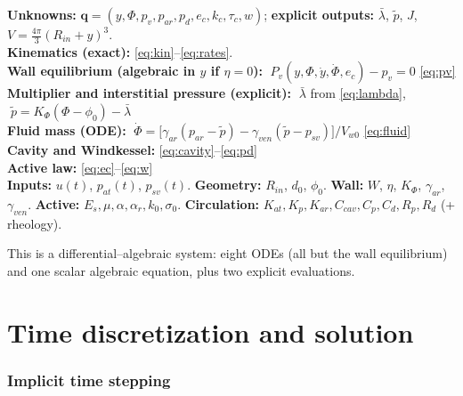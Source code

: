 \documentclass[11pt,a4paper]{article}
\newcommand{\Rin}{R_{in}}
\newcommand{\lb}{\bar\lambda}
\newcommand{\pf}{\tilde p}
\newcommand{\Vw}{V_{w0}}
\begin{document}
\begin{tcolorbox}[breakable,title=State and equations]
\textbf{Unknowns:} $\mathbf q=(y,\Phi,p_v,p_{ar},p_d,e_c,k_c,\tau_c,w)$; \textbf{explicit outputs:} $\lb$, $\pf$, $J$, $V=\tfrac{4\pi}{3}(\Rin+y)^3$.\\[2pt]
\textbf{Kinematics (exact):} \eqref{eq:kin}--\eqref{eq:rates}.\\
\textbf{Wall equilibrium (algebraic in $y$ if $\eta=0$):} $\;P_v(y,\Phi,\dot y,\dot\Phi,e_c)-p_v=0$ \hfill \eqref{eq:pv}\\
\textbf{Multiplier and interstitial pressure (explicit):} $\;\lb$ from \eqref{eq:lambda}, $\;\pf=K_\Phi(\Phi-\phi_0)-\lb$\\
\textbf{Fluid mass (ODE):} $\;\dot\Phi=\big[\gamma_{ar}(p_{ar}-\pf)-\gamma_{ven}(\pf-p_{sv})\big]/\Vw$ \hfill \eqref{eq:fluid}\\
\textbf{Cavity and Windkessel:} \eqref{eq:cavity}--\eqref{eq:pd}\\
\textbf{Active law:} \eqref{eq:ec}--\eqref{eq:w}\\[2pt]
\textbf{Inputs:} $u(t)$, $p_{at}(t)$, $p_{sv}(t)$. \textbf{Geometry:} $\Rin$, $d_0$, $\phi_0$. \textbf{Wall:} $W$, $\eta$, $K_\Phi$, $\gamma_{ar}$, $\gamma_{ven}$. \textbf{Active:} $E_s,\mu,\alpha,\alpha_r,k_0,\sigma_0$. \textbf{Circulation:} $K_{at},K_p,K_{ar},C_{cav},C_p,C_d,R_p,R_d$ (+ rheology).
\end{tcolorbox}

This is a differential--algebraic system: eight ODEs (all but the wall equilibrium) and one scalar algebraic equation, plus two explicit evaluations.

\part{Time discretization and solution}

\section{Implicit time stepping}
\end{document}
